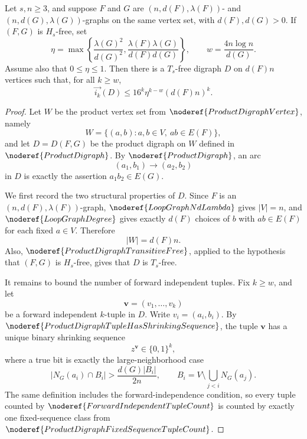 \begin{lemma}
Let \(s,n\ge 3\), and suppose \(F\) and \(G\) are \((n,d(F),\lambda(F))\)- and \((n,d(G),\lambda(G))\)-graphs on the same vertex set, with \(d(F),d(G)>0\). If \((F,G)\) is \(H_s\)-free, set
\[
  \eta=\max\left\{\frac{\lambda(G)^2}{d(G)^2},
  \frac{\lambda(F)\lambda(G)}{d(F)d(G)}\right\},
  \qquad
  w=\frac{4n\log n}{d(G)}.
\]
Assume also that \(0\le \eta\le 1\).
Then there is a \(T_s\)-free digraph \(D\) on \(d(F)n\) vertices such that, for all \(k\ge w\),
\[
  \overrightarrow{i_k}(D)\le 16^k \eta^{k-w}(d(F)n)^k.
\]
\end{lemma}
\begin{proof}
Let \(W\) be the product vertex set from \(\noderef{ProductDigraphVertex}\), namely
\[
  W=\{(a,b): a,b\in V,\ ab\in E(F)\},
\]
and let \(D=D(F,G)\) be the product digraph on \(W\) defined in \(\noderef{ProductDigraph}\). By \(\noderef{ProductDigraph}\), an arc
\[
  (a_1,b_1)\to(a_2,b_2)
\]
in \(D\) is exactly the assertion \(a_1b_2\in E(G)\).

We first record the two structural properties of \(D\). Since \(F\) is an \((n,d(F),\lambda(F))\)-graph, \(\noderef{LoopGraphNdLambda}\) gives \(|V|=n\), and \(\noderef{LoopGraphDegree}\) gives exactly \(d(F)\) choices of \(b\) with \(ab\in E(F)\) for each fixed \(a\in V\). Therefore
\[
  |W|=d(F)n.
\]
Also, \(\noderef{ProductDigraphTransitiveFree}\), applied to the hypothesis that \((F,G)\) is \(H_s\)-free, gives that \(D\) is \(T_s\)-free.

It remains to bound the number of forward independent tuples. Fix \(k\ge w\), and let
\[
  \mathbf v=(v_1,\ldots,v_k)
\]
be a forward independent \(k\)-tuple in \(D\). Write \(v_i=(a_i,b_i)\). By \(\noderef{ProductDigraphTupleHasShrinkingSequence}\), the tuple \(\mathbf v\) has a unique binary shrinking sequence
\[
  z^{\mathbf v}\in\{0,1\}^k,
\]
where a true bit is exactly the large-neighborhood case
\[
  |N_G(a_i)\cap B_i|>\frac{d(G)|B_i|}{2n},
  \qquad
  B_i=V\setminus\bigcup_{j<i}N_G(a_j).
\]
The same definition includes the forward-independence condition, so every tuple counted by \(\noderef{ForwardIndependentTupleCount}\) is counted by exactly one fixed-sequence class from \(\noderef{ProductDigraphFixedSequenceTupleCount}\).


\end{proof}

